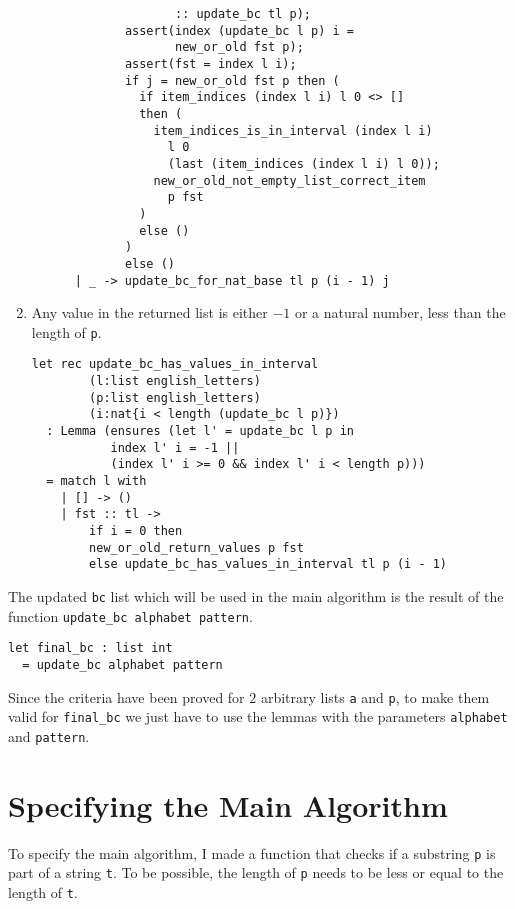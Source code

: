 \begin{enumerate}
\begin{verbatim}
                    :: update_bc tl p);
             assert(index (update_bc l p) i =
                    new_or_old fst p);
             assert(fst = index l i);
             if j = new_or_old fst p then (
               if item_indices (index l i) l 0 <> [] 
               then (
                 item_indices_is_in_interval (index l i)
                   l 0
                   (last (item_indices (index l i) l 0));
                 new_or_old_not_empty_list_correct_item
                   p fst
               )
               else ()
             )
             else ()
      | _ -> update_bc_for_nat_base tl p (i - 1) j
\end{verbatim}
\item Any value in the returned list is either \(-1\) or a natural number, less than the length of \texttt{p}.
\begin{verbatim}
let rec update_bc_has_values_in_interval
        (l:list english_letters)
        (p:list english_letters)
        (i:nat{i < length (update_bc l p)})
  : Lemma (ensures (let l' = update_bc l p in
           index l' i = -1 ||
           (index l' i >= 0 && index l' i < length p)))
  = match l with
    | [] -> ()
    | fst :: tl -> 
        if i = 0 then
        new_or_old_return_values p fst
        else update_bc_has_values_in_interval tl p (i - 1)
\end{verbatim}
\end{enumerate}

The updated \texttt{bc} list which will be used in the main algorithm is the result of the function \texttt{update\_bc alphabet pattern}.

\begin{verbatim}
let final_bc : list int 
  = update_bc alphabet pattern
\end{verbatim}

Since the criteria have been proved for \(2\) arbitrary lists \texttt{a} and \texttt{p}, to make them valid for \texttt{final\_bc} we just have to use the lemmas with the parameters \texttt{alphabet} and \texttt{pattern}.

\section{Specifying the Main Algorithm}

To specify the main algorithm, I made a function that checks if a substring \texttt{p} is part of a string \texttt{t}.
To be possible, the length of \texttt{p} needs to be less or equal to the length of \texttt{t}.

